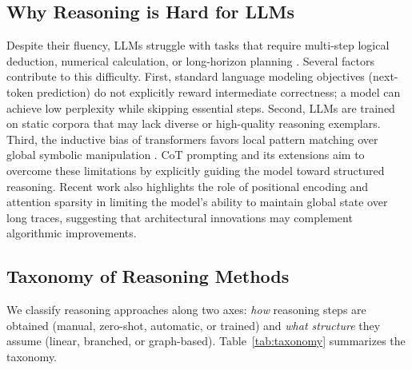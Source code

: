 \documentclass[11pt,a4paper]{article}
\begin{document}
\subsection{Why Reasoning is Hard for LLMs}
Despite their fluency, LLMs struggle with tasks that require multi-step logical deduction, numerical calculation, or long-horizon planning \citep{suzgun2022challenging}. Several factors contribute to this difficulty. First, standard language modeling objectives (next-token prediction) do not explicitly reward intermediate correctness; a model can achieve low perplexity while skipping essential steps. Second, LLMs are trained on static corpora that may lack diverse or high-quality reasoning exemplars. Third, the inductive bias of transformers favors local pattern matching over global symbolic manipulation \citep{ye2022unreliability}. CoT prompting and its extensions aim to overcome these limitations by explicitly guiding the model toward structured reasoning. Recent work also highlights the role of positional encoding and attention sparsity in limiting the model's ability to maintain global state over long traces, suggesting that architectural innovations may complement algorithmic improvements.

\subsection{Taxonomy of Reasoning Methods}
We classify reasoning approaches along two axes: \textit{how} reasoning steps are obtained (manual, zero-shot, automatic, or trained) and \textit{what structure} they assume (linear, branched, or graph-based). Table~\ref{tab:taxonomy} summarizes the taxonomy.
\end{document}

